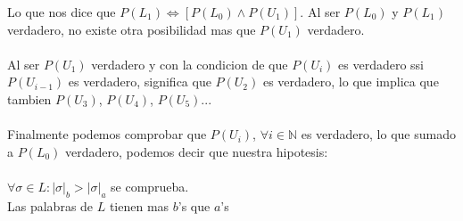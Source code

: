 \documentclass[spanish, draft]{article}
\begin{document}
\begin{itemize}
            Lo que nos dice que $P(L_1) \iff [ P(L_0) \land P(U_1) ] $. Al ser $P(L_0)$ y $P(L_1)$ verdadero, no existe otra posibilidad mas que $P(U_1)$ verdadero.\\
            \\
            Al ser $P(U_1)$ verdadero y con la condicion de que $P(U_i)$ es verdadero ssi $P(U_{i-1})$ es verdadero, significa que $P(U_2)$ es verdadero, lo que implica que tambien $P(U_3)$, $P(U_4)$, $P(U_5)$...\\
            \\
            Finalmente podemos comprobar que $P(U_i)$, $\forall i \in \mathbb{N}$ es verdadero, lo que sumado a $P(L_0)$ verdadero, podemos decir que nuestra hipotesis:\\
            \\
            $\forall \sigma \in L : |\sigma|_b > |\sigma|_a$ se comprueba.\\
        
            Las palabras de $L$ tienen mas $b$'s que $a$'s
\end{itemize}
\end{document}
